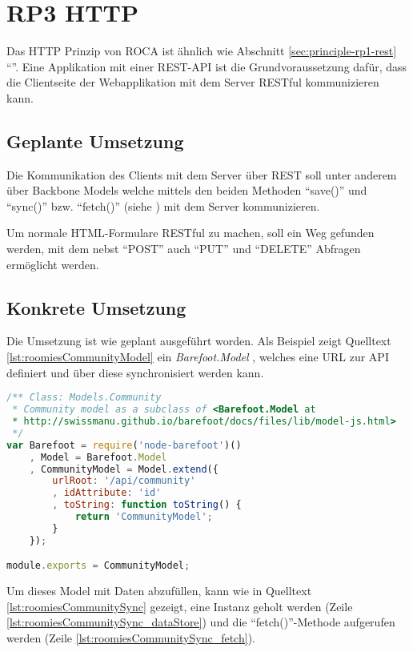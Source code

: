 \section{RP3 HTTP}
\label{sec:principle-rp3-http}

Das HTTP Prinzip von ROCA ist ähnlich wie Abschnitt \ref{sec:principle-rp1-rest} ``''.
Eine Applikation mit einer \gls{REST}-API ist die Grundvoraussetzung dafür, dass die Clientseite der Webapplikation mit dem Server \gls{RESTful} kommunizieren kann.

\subsection*{Geplante Umsetzung}
Die Kommunikation des Clients mit dem Server über \gls{REST} soll unter anderem über Backbone Models welche mittels den beiden Methoden ``save()'' und ``sync()'' bzw. ``fetch()'' (siehe \cite{BackboneSync}) mit dem Server kommunizieren.

Um normale HTML-Formulare \gls{RESTful} zu machen, soll ein Weg gefunden werden, mit dem nebst ``POST'' auch ``PUT'' und ``DELETE'' Abfragen ermöglicht werden.

\newpage
\subsection*{Konkrete Umsetzung}
Die Umsetzung ist wie geplant ausgeführt worden. Als Beispiel zeigt Quelltext \ref{lst:roomiesCommunityModel} ein \emph{Barefoot.Model} \cite{barefootModel}, welches eine URL zur API definiert und über diese synchronisiert werden kann.

\begin{lstlisting}[language=JavaScript, caption=Community Model \cite{roomiesCommunityModel}, label=lst:roomiesCommunityModel]
/** Class: Models.Community
 * Community model as a subclass of <Barefoot.Model at
 * http://swissmanu.github.io/barefoot/docs/files/lib/model-js.html>
 */
var Barefoot = require('node-barefoot')()
	, Model = Barefoot.Model
	, CommunityModel = Model.extend({
		urlRoot: '/api/community'
		, idAttribute: 'id'
		, toString: function toString() {
			return 'CommunityModel';
		}
	});

module.exports = CommunityModel;
\end{lstlisting}

Um dieses Model mit Daten abzufüllen, kann wie in Quelltext \ref{lst:roomiesCommunitySync} gezeigt, eine Instanz geholt werden (Zeile \ref{lst:roomiesCommunitySync_dataStore}) und die ``fetch()''-Methode aufgerufen werden (Zeile \ref{lst:roomiesCommunitySync_fetch}).

